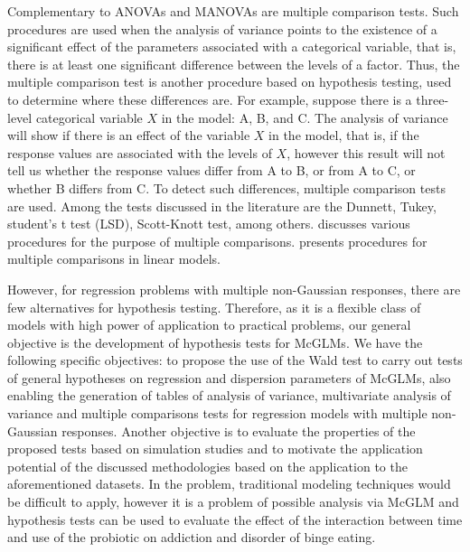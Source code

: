 \documentclass[AMA,STIX1COL]{WileyNJD-v2}
\begin{document}

Complementary to ANOVAs and MANOVAs are multiple comparison tests. Such procedures are used when the analysis of variance points to the existence of a significant effect of the parameters associated with a categorical variable, that is, there is at least one significant difference between the levels of a factor. Thus, the multiple comparison test is another procedure based on hypothesis testing, used to determine where these differences are. For example, suppose there is a three-level categorical variable $X$ in the model: A, B, and C. The analysis of variance will show if there is an effect of the variable $X$ in the model, that is, if the response values are associated with the levels of $X$, however this result will not tell us whether the response values differ from A to B, or from A to C, or whether B differs from C. To detect such differences, multiple comparison tests are used. Among the tests discussed in the literature are the Dunnett, Tukey, student's t test (LSD), Scott-Knott test, among others. \cite{hsu1996multiple} discusses various procedures for the purpose of multiple comparisons. \cite{bretz2008multiple} presents procedures for multiple comparisons in linear models.


However, for regression problems with multiple non-Gaussian responses, there are few alternatives for hypothesis testing. Therefore, as it is a flexible class of models with high power of application to practical problems, our general objective is the development of hypothesis tests for McGLMs. We have the following specific objectives: to propose the use of the Wald test to carry out tests of general hypotheses on regression and dispersion parameters of McGLMs, also enabling the generation of tables of analysis of variance, multivariate analysis of variance and multiple comparisons tests for regression models with multiple non-Gaussian responses. Another objective is to evaluate the properties of the proposed tests based on simulation studies and to motivate the application potential of the discussed methodologies based on the application to the aforementioned datasets. In the problem, traditional modeling techniques would be difficult to apply, however it is a problem of possible analysis via McGLM and hypothesis tests can be used to evaluate the effect of the interaction between time and use of the probiotic on addiction and disorder of binge eating.
\end{document}
